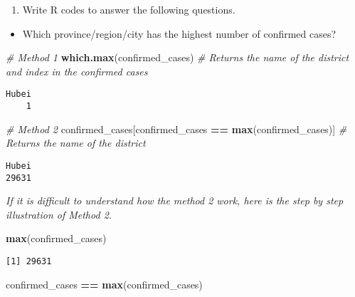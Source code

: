 \documentclass[]{article}
\newenvironment{Shaded}{\begin{snugshade}}{\end{snugshade}}
\newcommand{\CommentTok}[1]{\textcolor[rgb]{0.56,0.35,0.01}{\textit{#1}}}
\newcommand{\KeywordTok}[1]{\textcolor[rgb]{0.13,0.29,0.53}{\textbf{#1}}}
\newcommand{\NormalTok}[1]{#1}
\newcommand{\OperatorTok}[1]{\textcolor[rgb]{0.81,0.36,0.00}{\textbf{#1}}}
\newcommand{\StringTok}[1]{\textcolor[rgb]{0.31,0.60,0.02}{#1}}
\providecommand{\tightlist}{%
  \setlength{\itemsep}{0pt}\setlength{\parskip}{0pt}}
\begin{document}
\begin{enumerate}
\def\labelenumi{\roman{enumi})}
\setcounter{enumi}{2}
\tightlist
\item
  Write R codes to answer the following questions.
\end{enumerate}

\begin{itemize}
\tightlist
\item
  Which province/region/city has the highest number of confirmed cases?
\end{itemize}

\begin{Shaded}
\begin{Highlighting}[]
\CommentTok{# Method 1}
\KeywordTok{which.max}\NormalTok{(confirmed_cases) }\CommentTok{# Returns the name of the district and index in the confirmed cases}
\end{Highlighting}
\end{Shaded}

\begin{verbatim}
Hubei 
    1 
\end{verbatim}

\begin{Shaded}
\begin{Highlighting}[]
\CommentTok{# Method 2}
\NormalTok{confirmed_cases[confirmed_cases }\OperatorTok{==}\StringTok{ }\KeywordTok{max}\NormalTok{(confirmed_cases)] }\CommentTok{# Returns the name of the district}
\end{Highlighting}
\end{Shaded}

\begin{verbatim}
Hubei 
29631 
\end{verbatim}

\emph{If it is difficult to understand how the method 2 work, here is
the step by step illustration of Method 2.}

\begin{Shaded}
\begin{Highlighting}[]
\KeywordTok{max}\NormalTok{(confirmed_cases)}
\end{Highlighting}
\end{Shaded}

\begin{verbatim}
[1] 29631
\end{verbatim}

\begin{Shaded}
\begin{Highlighting}[]
\NormalTok{confirmed_cases }\OperatorTok{==}\StringTok{ }\KeywordTok{max}\NormalTok{(confirmed_cases)}
\end{Highlighting}
\end{Shaded}
\end{document}
